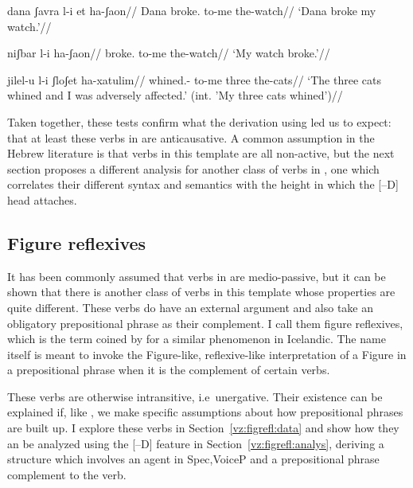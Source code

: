 {\pex
	\a \begingl
	\gla{}dana ʃavra l-i et ha-ʃaon//
	\glb Dana broke. to-me  the-watch//
	\glft `Dana broke my watch.'//
	\endgl
	
	\a \begingl
	\gla{}niʃbar l-i ha-ʃaon//
	\glb broke. to-me the-watch//
	\glft `My watch broke.'//
	\endgl
\xe

\ex \begingl
	\gla\ljudge{\#}jilel-u l-i ʃloʃet ha-xatulim//
	\glb whined.- to-me three the-cats//
	\glft `The three cats whined and I was adversely affected.' (int. 'My three cats whined')//
	\endgl
\xe
   
Taken together, these tests confirm what the derivation using {\vz} led us to expect: that at least these verbs in {\tnif} are anticausative. A common assumption in the Hebrew literature is that verbs in this template are all non-active, but the next section proposes a different analysis for another class of verbs in {\tnif}, one which correlates their different syntax and semantics with the height in which the [--D] head attaches.

	
	\subsection{Figure reflexives} \label{vz:tnif:figrefl}
It has been commonly assumed that verbs in {\tnif} are medio-passive, but it can be shown that there is another class of verbs in this template whose properties are quite different. These verbs do have an external argument and also take an obligatory prepositional phrase as their complement. I call them figure reflexives, which is the term coined by \cite{wood14nllt} for a similar phenomenon in Icelandic. The name itself is meant to invoke the Figure-like, reflexive-like interpretation of a Figure in a prepositional phrase when it is the complement of certain verbs. 

These verbs are otherwise intransitive, i.e~unergative. Their existence can be explained if, like \cite{wood14nllt,wood15springer}, we make specific assumptions about how prepositional phrases are built up. I explore these verbs in Section~\ref{vz:figrefl:data} and show how they an be analyzed using the [--D] feature in Section~\ref{vz:figrefl:analys}, deriving a structure which involves an agent in Spec,VoiceP and a prepositional phrase complement to the verb.

}
